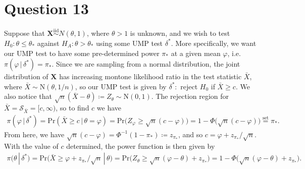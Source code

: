 \documentclass[10pt]{article}
\begin{document}
\section{Question 13} \noindent
Suppose that \(\bm{X} \overset{\mathrm{iid}}{\sim} N(\theta, 1)\), where \(\theta > 1\) is unknown, and we wish to test 
\(H_0 : \theta \le \theta_*\) against \(H_A : \theta > \theta_*\) using some UMP test \(\delta^*\). 
More specifically, we want our UMP test to have some pre-determined power \(\pi_*\) at a given mean \(\varphi\), i.e. \(\pi(\varphi \,|\, \delta^*) = \pi_*\).
Since we are sampling from a normal distribution, the joint distribution of \(\bm{X}\) has increasing montone likelihood ratio 
in the test statistic \(\bar{X}\), where \(\bar{X} \sim \mathrm{N}(\theta, 1 / n)\), so our UMP test is given by \(\delta^* : \) reject 
\(H_0\) if \(\bar{X} \ge c\). 
We also notice that \(\sqrt{n}(\bar{X} - \theta) \coloneqq Z_{\theta} \sim \mathrm{N}(0,1)\). 
The rejection region for \(\bar{X} = \mathcal{S}_{\bar{X}} = [c,\infty)\), so to find \(c\) we have 
\begin{align*}
    \pi (\varphi \,|\, \delta^*)
    = \mathrm{Pr}(\bar{X} \ge c \,|\, \theta = \varphi)
    = \mathrm{Pr} \big( Z_{\varphi} \ge \sqrt{n}(c - \varphi) \big)
    = 1 - \Phi \big( \sqrt{n}(c - \varphi) \big)
    \overset{\mathrm{set}}{=} \pi_*.
\end{align*}
From here, we have \(\sqrt{n}(c - \varphi) = \Phi^{-1}(1 - \pi_*) \coloneqq z_{\pi_*}\), and so \(c = \varphi + z_{\pi_*} / \sqrt{n}\).
With the value of \(c\) determined, the power function is then given by 
\begin{align*}
    \pi(\theta \,|\, \delta^*)
    = \mathrm{Pr} \big( \bar{X} \ge \varphi + z_{\pi_*} / \sqrt{n} \,|\, \theta \big)
    = \mathrm{Pr} \big( Z_{\theta} \ge \sqrt{n}(\varphi - \theta) + z_{\pi_*} \big)
    = 1 - \Phi \big(  \sqrt{n}(\varphi - \theta) + z_{\pi_*} \big).
\end{align*}
\end{document}
